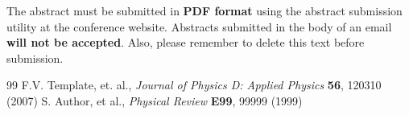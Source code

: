 \documentclass[12pt]{article}
\begin{document}
The abstract must be submitted in \textbf{PDF format} using the abstract submission utility at the conference website. Abstracts submitted in the body of an email \textbf{will not be accepted}. Also, please remember to delete this text before submission.


\begin{thebibliography}{99}
	F.V. Template, et. al., \textit{Journal of Physics D: Applied Physics} {\bf 56}, 120310 (2007)
	S. Author, et al., \textit{Physical Review} {\bf E99}, 99999 (1999)
\end{thebibliography}
\end{document}

